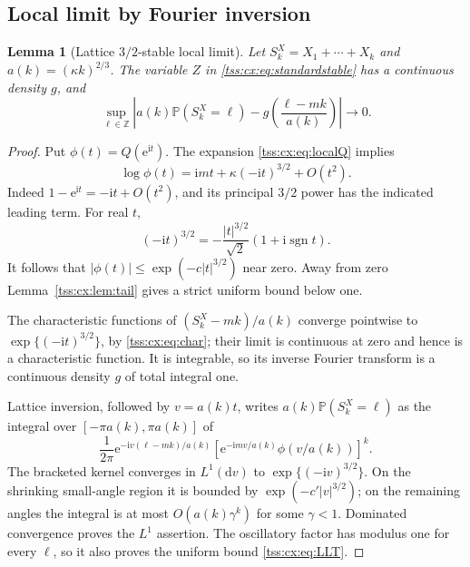 \documentclass[11pt]{article}
\newtheorem{lemma}[theorem]{Lemma}
\theoremstyle{remark}\newtheorem{remark}[theorem]{Remark}
\theoremstyle{definition}\newtheorem{definition}[theorem]{Definition}
\newcommand{\ii}{\mathrm i}
\newcommand{\dd}{\mathrm d}
\newcommand{\e}{\mathrm e}
\newcommand{\Prob}{\mathbb P}
\begin{document}
\subsection{Local limit by Fourier inversion}
\begin{lemma}[Lattice $3/2$-stable local limit]\label{tss:cx:lem:LLT}
Let $S_k^X=X_1+\cdots+X_k$ and $a(k)=(\kappa k)^{2/3}$.
The variable $Z$ in \eqref{tss:cx:eq:standardstable} has a continuous density
$g$, and
\begin{equation}\label{tss:cx:eq:LLT}
 \sup_{\ell\in\mathbb Z}
 \left|a(k)\Prob(S_k^X=\ell)
       -g\left(\frac{\ell-mk}{a(k)}\right)\right|
 \longrightarrow0.
\end{equation}
\end{lemma}
\begin{proof}
Put $\phi(t)=Q(\e^{\ii t})$. The expansion \eqref{tss:cx:eq:localQ}
implies
\begin{equation}\label{tss:cx:eq:char}
 \log\phi(t)=\ii mt+\kappa(-\ii t)^{3/2}+O(t^2).
\end{equation}
Indeed $1-\e^{\ii t}=-\ii t+O(t^2)$, and its principal
$3/2$ power has the indicated leading term. For real $t$,
\[
 (-\ii t)^{3/2}
 =-\frac{|t|^{3/2}}{\sqrt2}(1+\ii\operatorname{sgn}t).
\]
It follows that $|\phi(t)|\le\exp(-c|t|^{3/2})$ near zero.
Away from zero Lemma~\ref{tss:cx:lem:tail} gives a strict uniform bound
below one.

The characteristic functions of $(S_k^X-mk)/a(k)$ converge pointwise
to $\exp\{(-\ii t)^{3/2}\}$, by \eqref{tss:cx:eq:char}; their limit is
continuous at zero and hence is a characteristic function. It is
integrable, so its inverse Fourier transform is a continuous density
$g$ of total integral one.

Lattice inversion, followed by $v=a(k)t$, writes
$a(k)\Prob(S_k^X=\ell)$ as the integral over
$[-\pi a(k),\pi a(k)]$ of
\[
 \frac1{2\pi}
 \e^{-\ii v(\ell-mk)/a(k)}
 \left[\e^{-\ii mv/a(k)}\phi(v/a(k))\right]^k.
\]
The bracketed kernel converges in $L^1(\dd v)$ to
$\exp\{(-\ii v)^{3/2}\}$. On the shrinking small-angle region
it is bounded by $\exp(-c'|v|^{3/2})$; on the remaining angles
the integral is at most $O(a(k)\gamma^k)$ for some $\gamma<1$.
Dominated convergence proves the $L^1$ assertion. The oscillatory
factor has modulus one for every $\ell$, so it also proves the
uniform bound \eqref{tss:cx:eq:LLT}.
\end{proof}
\end{document}
